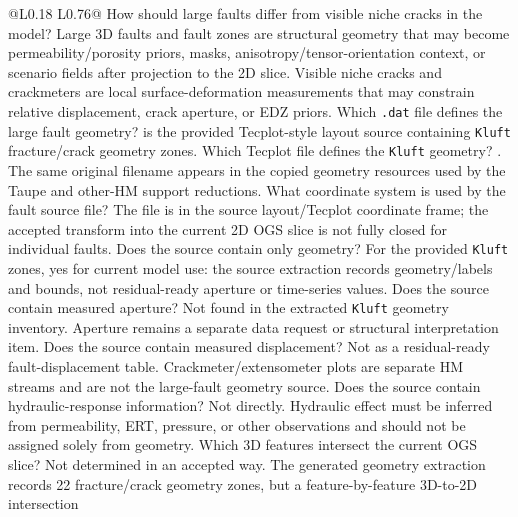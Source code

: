 \begin{longtable}{@{}L{0.18\textwidth} L{0.76\textwidth}@{}}
\toprule
{}
{ How should large faults differ from visible niche cracks in the model?}
{Large 3D faults and fault zones are structural geometry that may become
permeability/porosity priors, masks, anisotropy/tensor-orientation context, or
scenario fields after projection to the 2D slice.  Visible niche cracks and
crackmeters are local surface-deformation measurements that may constrain relative
displacement, crack aperture, or EDZ priors.}
{ Which \texttt{.dat} file defines the large fault geometry?}
{ is the provided Tecplot-style layout source containing
\texttt{Kluft} fracture/crack geometry zones.}
{ Which Tecplot file defines the \texttt{Kluft} geometry?}
{.  The same original filename appears in the copied
geometry resources used by the Taupe and other-HM support reductions.}
{ What coordinate system is used by the fault source file?}
{The file is in the source layout/Tecplot coordinate frame; the accepted transform
into the current 2D OGS slice is not fully closed for individual faults.}
{ Does the source contain only geometry?}
{For the provided \texttt{Kluft} zones, yes for current model use: the source
extraction records geometry/labels and bounds, not residual-ready aperture or
time-series values.}
{ Does the source contain measured aperture?}
{Not found in the extracted \texttt{Kluft} geometry inventory.  Aperture remains a
separate data request or structural interpretation item.}
{ Does the source contain measured displacement?}
{Not as a residual-ready fault-displacement table.  Crackmeter/extensometer plots are
separate HM streams and are not the large-fault geometry source.}
{ Does the source contain hydraulic-response information?}
{Not directly.  Hydraulic effect must be inferred from permeability, ERT, pressure, or
other observations and should not be assigned solely from geometry.}
{ Which 3D features intersect the current OGS slice?}
{Not determined in an accepted way.  The generated geometry extraction records
22 fracture/crack geometry zones, but a feature-by-feature 3D-to-2D intersection
}
\end{longtable}
